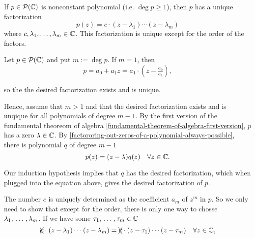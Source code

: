 \begin{thm} 
  \label{fundamental-theorem-of-algebra-second-version}
  If $p \in \mathcal{P}(\mathbb{C})$ is nonconstant polynomial (i.e. $\deg p \geq 1$), then $p$ has a unique factorization
  \begin{equation}
  	p(z)=c \cdot (z-\lambda_1) \cdots (z-\lambda_m)
  \end{equation}
  where $c, \lambda_1, \dots, \lambda_m \in \mathbb{C}$. This factorization is unique except for the order of the factors.
\end{thm}
\begin{prf}
  Let $p \in \mathcal{P}(\mathbb{C})$ and put $m := \deg p$. If $m = 1$, then
  \[
    p = a_0 + a_1 z = a_1 \cdot \left(z-\tfrac{a_0}{a_1} \right),
  \]

  so the the desired factorization exists and is unique.

  Hence, assume that $m > 1$ and that the desired factorization exists and is unqique for all polynomials of degree $m-1$.
  By the first version of the fundamental theoreom of algebra \ref{fundamental-theorem-of-algebra-first-version}, $p$ has a zero $\lambda \in \mathbb{C}$. By \ref{factororing-out-zeros-of-a-polynomial-always-possible}, there is polynomial $q$ of degree $m-1$ \st
  \[
    p(z) = (z-\lambda) q(z) \quad \forall z \in \mathbb{C}.
  \]

  Our induction hypothesis implies that $q$ has the desired factorization, which when plugged into the equation above, gives the desired factorization of $p$.

   The number $c$ is uniquely determined as the coefficient $a_m$ of $z^m$ in $p$. So we only need to show that except for the order, there is only one way to chosse $\lambda_1, {\, \ldots \,\,}, \lambda_m$. If we have some $\tau_1, {\, \ldots \,\,}, \tau_m \in \mathbb{C}$ \st
  \begin{equation}
    \xcancel{\mathlarger{c}} \cdot (z - \lambda_1) \cdots (z-\lambda_m) = \xcancel{\mathlarger{c}} \cdot (z-\tau_1) \cdots (z-\tau_m) \quad \forall z \in \compl,
  \end{equation}



\end{prf}
